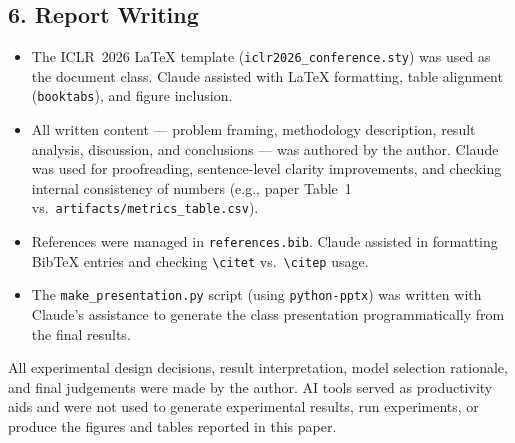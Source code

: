 \documentclass{article}
\begin{document}
\subsection*{6. Report Writing}
\begin{itemize}
  \item The ICLR~2026 LaTeX template (\texttt{iclr2026\_conference.sty}) was used
        as the document class. Claude assisted with LaTeX formatting, table
        alignment (\texttt{booktabs}), and figure inclusion.
  \item All written content — problem framing, methodology description, result
        analysis, discussion, and conclusions — was authored by the author.
        Claude was used for proofreading, sentence-level clarity improvements,
        and checking internal consistency of numbers (e.g., paper Table~1 vs.\
        \texttt{artifacts/metrics\_table.csv}).
  \item References were managed in \texttt{references.bib}. Claude assisted
        in formatting BibTeX entries and checking \texttt{\textbackslash citet}
        vs.\ \texttt{\textbackslash citep} usage.
  \item The \texttt{make\_presentation.py} script (using \texttt{python-pptx})
        was written with Claude's assistance to generate the class presentation
        programmatically from the final results.
\end{itemize}

\bigskip
\noindent All experimental design decisions, result interpretation, model selection
rationale, and final judgements were made by the author. AI tools served as
productivity aids and were not used to generate experimental results, run
experiments, or produce the figures and tables reported in this paper.
\end{document}
